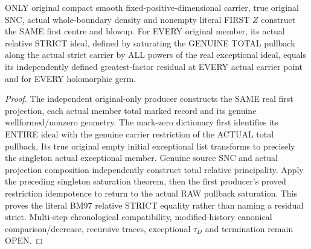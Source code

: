 \begin{theorem}
\label{hir:sharp-original-first-member-relative-strict-saturation-eq-residual}
\leanok
ONLY original compact smooth fixed-positive-dimensional carrier, true
original SNC, actual whole-boundary density and nonempty literal FIRST
$Z$ construct the SAME first centre and blowup. For EVERY original member,
its actual relative STRICT ideal, defined by saturating the GENUINE TOTAL
pullback along the actual strict carrier by ALL powers of the real
exceptional ideal, equals its independently defined greatest-factor
residual at EVERY actual carrier point and for EVERY holomorphic germ.
\end{theorem}
\begin{proof}
The independent original-only producer constructs the SAME real first
projection, each actual member total marked record and its genuine
wellformed/nonzero geometry. The mark-zero dictionary first identifies its
ENTIRE ideal with the genuine carrier restriction of the ACTUAL total
pullback. Its true original empty initial exceptional list transforms to
precisely the singleton actual exceptional member. Genuine source SNC and
actual projection composition independently construct total relative
principality. Apply the preceding singleton saturation theorem, then the
first producer's proved restriction idempotence to return to the actual RAW
pullback saturation. This proves the literal BM97 relative STRICT equality
rather than naming a residual strict. Multi-step chronological compatibility,
modified-history canonical comparison/decrease, recursive traces, exceptional
$\tau_D$ and termination remain OPEN.
\end{proof}
